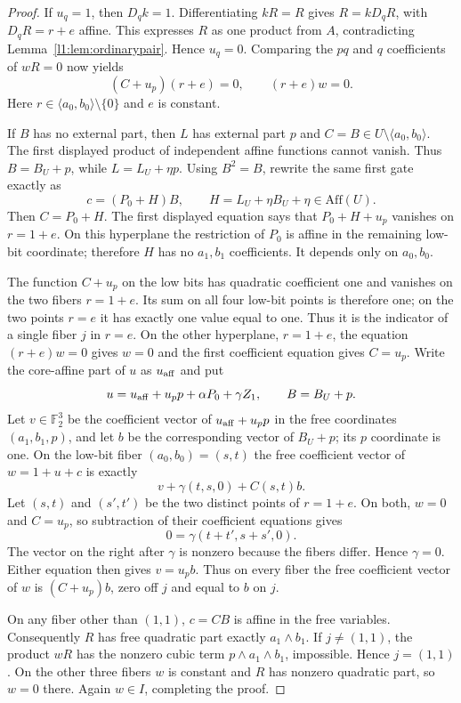 \documentclass[11pt,a4paper]{article}
\theoremstyle{plain}
\theoremstyle{remark}
\newcommand{\F}{\mathbb F_2}
\newcommand{\Aff}{\mathrm{Aff}}
\begin{document}
\begin{proof}
If $u_q=1$, then $D_qk=1$. Differentiating $kR=R$ gives $R=kD_qR$, with $D_qR=r+e$ affine. This expresses $R$ as one product from $A$, contradicting Lemma~\ref{l1:lem:ordinarypair}. Hence $u_q=0$. Comparing the $pq$ and $q$ coefficients of $wR=0$ now yields
\[
(C+u_p)(r+e)=0,\qquad (r+e)w=0.
\]
Here $r\in\langle a_0,b_0\rangle\setminus\{0\}$ and $e$ is constant.

If $B$ has no external part, then $L$ has external part $p$ and $C=B\in U\setminus\langle a_0,b_0\rangle$. The first displayed product of independent affine functions cannot vanish. Thus $B=B_U+p$, while $L=L_U+\eta p$. Using $B^2=B$, rewrite the same first gate exactly as
\[
c=(P_0+H)B,\qquad H=L_U+\eta B_U+\eta\in\Aff(U).
\]
Then $C=P_0+H$. The first displayed equation says that $P_0+H+u_p$ vanishes on $r=1+e$. On this hyperplane the restriction of $P_0$ is affine in the remaining low-bit coordinate; therefore $H$ has no $a_1,b_1$ coefficients. It depends only on $a_0,b_0$.

The function $C+u_p$ on the low bits has quadratic coefficient one and vanishes on the two fibers $r=1+e$. Its sum on all four low-bit points is therefore one; on the two points $r=e$ it has exactly one value equal to one. Thus it is the indicator of a single fiber $j$ in $r=e$.
On the other hyperplane, $r=1+e$, the equation $(r+e)w=0$ gives $w=0$ and the first coefficient equation gives $C=u_p$.
Write the core-affine part of $u$ as $u_{\rm aff}$ and put
\[
u=u_{\rm aff}+u_p p+\alpha P_0+\gamma Z_1,
\qquad B=B_U+p.
\]
Let $v\in\F^3$ be the coefficient vector of $u_{\rm aff}+u_p p$ in the free coordinates $(a_1,b_1,p)$, and let $b$ be the corresponding vector of $B_U+p$; its $p$ coordinate is one. On the low-bit fiber $(a_0,b_0)=(s,t)$ the free coefficient vector of $w=1+u+c$ is exactly
\[
v+\gamma(t,s,0)+C(s,t)b.
\]
Let $(s,t)$ and $(s',t')$ be the two distinct points of $r=1+e$. On both, $w=0$ and $C=u_p$, so subtraction of their coefficient equations gives
\[
0=\gamma(t+t',s+s',0).
\]
The vector on the right after $\gamma$ is nonzero because the fibers differ. Hence $\gamma=0$. Either equation then gives $v=u_pb$. Thus on every fiber the free coefficient vector of $w$ is $(C+u_p)b$, zero off $j$ and equal to $b$ on $j$.



On any fiber other than $(1,1)$, $c=CB$ is affine in the free variables. Consequently $R$ has free quadratic part exactly $a_1\wedge b_1$. If $j\ne(1,1)$, the product $wR$ has the nonzero cubic term $p\wedge a_1\wedge b_1$, impossible. Hence $j=(1,1)$. On the other three fibers $w$ is constant and $R$ has nonzero quadratic part, so $w=0$ there. Again $w\in I$, completing the proof.
\end{proof}
\end{document}

